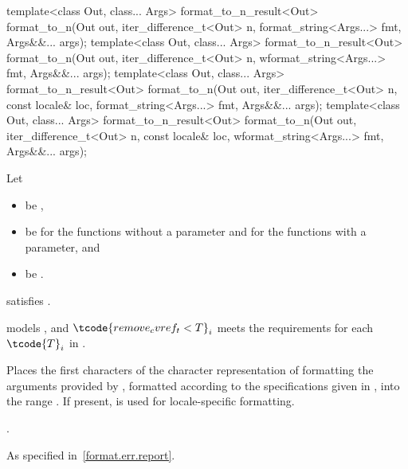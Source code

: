 %
\begin{itemdecl}
template<class Out, class... Args>
  format_to_n_result<Out> format_to_n(Out out, iter_difference_t<Out> n,
                                      format_string<Args...> fmt, Args&&... args);
template<class Out, class... Args>
  format_to_n_result<Out> format_to_n(Out out, iter_difference_t<Out> n,
                                      wformat_string<Args...> fmt, Args&&... args);
template<class Out, class... Args>
  format_to_n_result<Out> format_to_n(Out out, iter_difference_t<Out> n,
                                      const locale& loc, format_string<Args...> fmt,
                                      Args&&... args);
template<class Out, class... Args>
  format_to_n_result<Out> format_to_n(Out out, iter_difference_t<Out> n,
                                      const locale& loc, wformat_string<Args...> fmt,
                                      Args&&... args);
\end{itemdecl}

\begin{itemdescr}
\pnum
Let
\begin{itemize}
\item {} be ,
\item {} be
 for the functions without a  parameter and
 for the functions with a  parameter, and
\item {} be .
\end{itemize}

\pnum
\constraints
{} satisfies .

\pnum
\expects
{} models , and
$\tcode{remove_cvref_t<T}_i$
meets the  requirements
for each $\tcode{T}_i$ in .

\pnum
\effects
Places the first  characters of the character representation of
formatting the arguments provided by ,
formatted according to the specifications given in ,
into the range .
If present,  is used for locale-specific formatting.

\pnum
\returns
{}.

\pnum
\throws
As specified in~\ref{format.err.report}.
\end{itemdescr}

